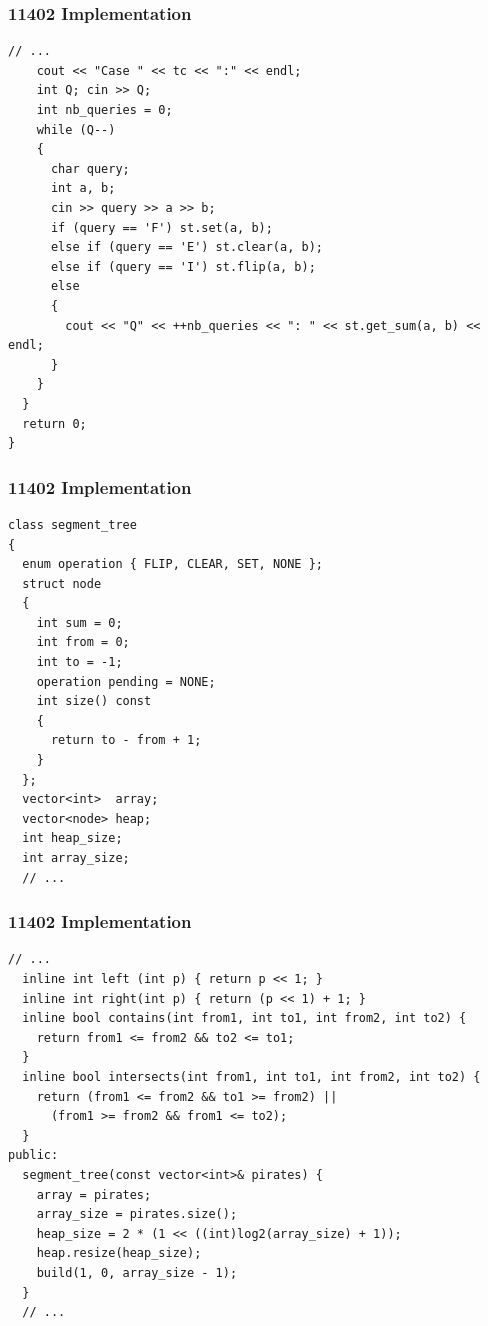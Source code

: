 \documentclass{beamer}
\begin{document}
\begin{frame}[containsverbatim]
\frametitle{11402 Implementation}

\scriptsize

\begin{lstlisting}[mathescape]
    // ...
    cout << "Case " << tc << ":" << endl;
    int Q; cin >> Q;
    int nb_queries = 0;
    while (Q--)
    {
      char query;
      int a, b;
      cin >> query >> a >> b;
      if (query == 'F') st.set(a, b);
      else if (query == 'E') st.clear(a, b);
      else if (query == 'I') st.flip(a, b);
      else
      {
        cout << "Q" << ++nb_queries << ": " << st.get_sum(a, b) << endl;
      }
    }
  }
  return 0;
}
\end{lstlisting}

\end{frame}

\begin{frame}[containsverbatim]
\frametitle{11402 Implementation}

\scriptsize

\begin{lstlisting}[mathescape]
class segment_tree
{
  enum operation { FLIP, CLEAR, SET, NONE };
  struct node
  {
    int sum = 0;
    int from = 0;
    int to = -1;
    operation pending = NONE;
    int size() const
    {
      return to - from + 1;
    }
  };
  vector<int>  array;
  vector<node> heap;
  int heap_size;
  int array_size;
  // ...
\end{lstlisting}

\end{frame}

\begin{frame}[containsverbatim]
\frametitle{11402 Implementation}

\scriptsize

\begin{lstlisting}[mathescape]
  // ...
  inline int left (int p) { return p << 1; }
  inline int right(int p) { return (p << 1) + 1; }
  inline bool contains(int from1, int to1, int from2, int to2) {
    return from1 <= from2 && to2 <= to1;
  }
  inline bool intersects(int from1, int to1, int from2, int to2) {
    return (from1 <= from2 && to1 >= from2) ||
      (from1 >= from2 && from1 <= to2);
  }
public:
  segment_tree(const vector<int>& pirates) {
    array = pirates;
    array_size = pirates.size();
    heap_size = 2 * (1 << ((int)log2(array_size) + 1));
    heap.resize(heap_size);
    build(1, 0, array_size - 1);
  }
  // ...
\end{lstlisting}

\end{frame}
\end{document}
